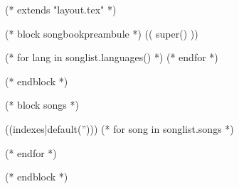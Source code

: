(* extends "layout.tex" *)

(* block songbookpreambule *)
   (( super() ))


   (* for lang in songlist.languages() *)
   (* endfor *)
   \usepackage[((lang))]{babel}

   \graphicspath{{((datadir))/img/}}
(* endblock *)

(* block songs *)

   \begin{songs}{((indexes|default('')))}
      (* for song in songlist.songs *)
      
      (* endfor *)
   \end{songs}
(* endblock *)
